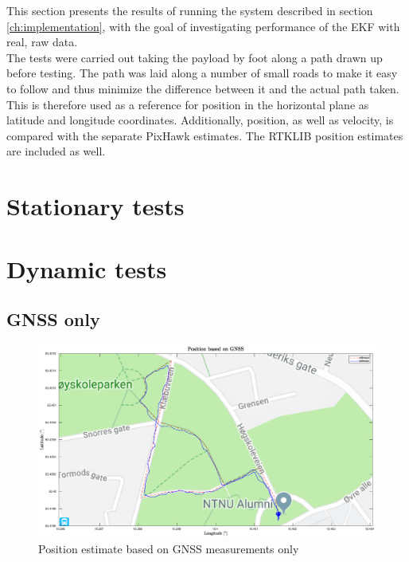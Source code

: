 This section presents the results of running the system described in section \ref{ch:implementation}, with the goal of investigating performance of the EKF with real, raw data.\\ 


% 
The tests were carried out taking the payload by foot along a path drawn up before testing. The path was laid along a number of small roads to make it easy to follow and thus minimize the difference between it and the actual path taken. This is therefore used as a reference for position in the horizontal plane as latitude and longitude coordinates. Additionally, position, as well as velocity, is compared with the separate PixHawk estimates. The RTKLIB position estimates are included as well.\\

\section{Stationary tests}

\section{Dynamic tests}
    \subsection{GNSS only}
    \begin{figure}
        \centering
        \includegraphics[scale=0.3]{Results/Images/gnss-only.eps}
        \caption{Position estimate based on GNSS measurements only}
        \label{fig:test-gnss}
    \end{figure}
    
